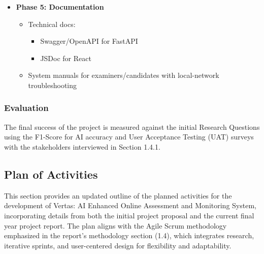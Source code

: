 \begin{itemize}[leftmargin=1.4em]
    \item \textbf{Phase 5: Documentation}
    \begin{itemize}
        \item Technical docs:
        \begin{itemize}
            \item Swagger/OpenAPI for FastAPI
            \item JSDoc for React
        \end{itemize}
        \item System manuals for examiners/candidates with local-network troubleshooting
    \end{itemize}
\end{itemize}


\subsubsection{Evaluation}
The final success of the project is measured against the initial Research Questions using the F1-Score for AI accuracy and User Acceptance Testing (UAT) surveys with the stakeholders interviewed in Section 1.4.1.

\subsection{Plan of Activities}
This section provides an updated outline of the planned activities for the development of Vertas: AI Enhanced Online Assessment and Monitoring System, incorporating details from both the initial project proposal and the current final year project report. The plan aligns with the Agile Scrum methodology emphasized in the report's methodology section (1.4), which integrates research, iterative sprints, and user-centered design for flexibility and adaptability.

